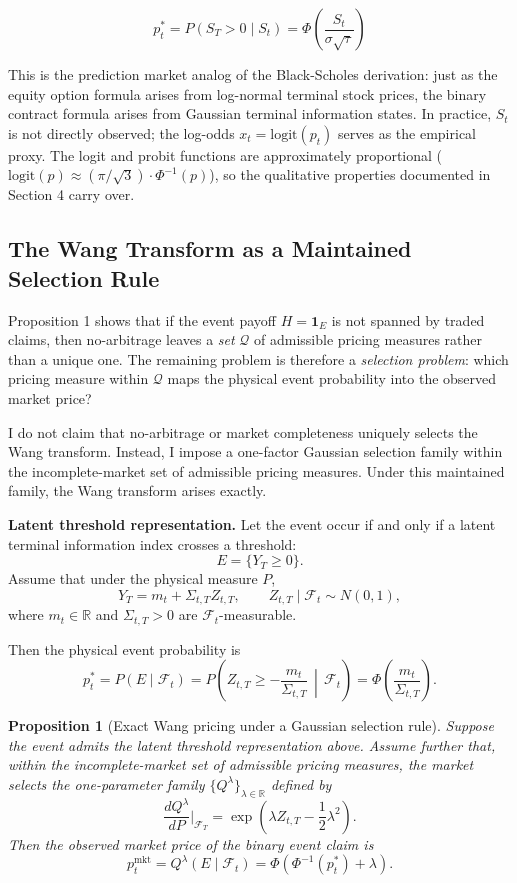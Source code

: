 \documentclass[12pt,a4paper]{article}
\newtheorem{proposition}{Proposition}
\begin{document}
\[p_t^* = P(S_T > 0 \mid S_t) = \Phi\!\left(\frac{S_t}{\sigma\sqrt{\tau}}\right)\]

This is the prediction market analog of the Black-Scholes derivation:
just as the equity option formula arises from log-normal terminal stock
prices, the binary contract formula arises from Gaussian terminal
information states. In practice, \(S_t\) is not directly observed; the
log-odds \(x_t = \text{logit}(p_t)\) serves as the empirical proxy. The
logit and probit functions are approximately proportional
(\(\text{logit}(p) \approx (\pi/\sqrt{3}) \cdot \Phi^{-1}(p)\)), so the
qualitative properties documented in Section 4 carry over.

\subsection{The Wang Transform as a Maintained Selection Rule}\label{the-wang-transform-selection-rule}

Proposition 1 shows that if the event payoff $H=\mathbf{1}_E$ is not spanned by traded claims, then no-arbitrage leaves a \emph{set} $\mathcal Q$ of admissible pricing measures rather than a unique one. The remaining problem is therefore a \emph{selection problem}: which pricing measure within $\mathcal Q$ maps the physical event probability into the observed market price?

I do not claim that no-arbitrage or market completeness uniquely selects the Wang transform. Instead, I impose a one-factor Gaussian selection family within the incomplete-market set of admissible pricing measures. Under this maintained family, the Wang transform arises exactly.

\textbf{Latent threshold representation.} Let the event occur if and only if a latent terminal information index crosses a threshold:
\[
E=\{Y_T\ge 0\}.
\]
Assume that under the physical measure $P$,
\[
Y_T = m_t + \Sigma_{t,T} Z_{t,T},
\qquad
Z_{t,T}\mid \mathcal F_t \sim N(0,1),
\]
where $m_t\in\mathbb R$ and $\Sigma_{t,T}>0$ are $\mathcal F_t$-measurable.

Then the physical event probability is
\[
p_t^*
=
P(E\mid\mathcal F_t)
=
P\!\left(Z_{t,T}\ge -\frac{m_t}{\Sigma_{t,T}} \,\middle|\, \mathcal F_t\right)
=
\Phi\!\left(\frac{m_t}{\Sigma_{t,T}}\right).
\]

\begin{proposition}[Exact Wang pricing under a Gaussian selection rule]
Suppose the event admits the latent threshold representation above. Assume further that, within the incomplete-market set of admissible pricing measures, the market selects the one-parameter family $\{Q^\lambda\}_{\lambda\in\mathbb R}$ defined by
\[
\frac{dQ^\lambda}{dP}\Big|_{\mathcal F_T}
=
\exp\!\left(\lambda Z_{t,T}-\frac{1}{2}\lambda^2\right).
\]
Then the observed market price of the binary event claim is
\[
p_t^{\mathrm{mkt}}
=
Q^\lambda(E\mid \mathcal F_t)
=
\Phi\!\left(\Phi^{-1}(p_t^*)+\lambda\right).
\tag{1}
\]
\end{proposition}
\end{document}
